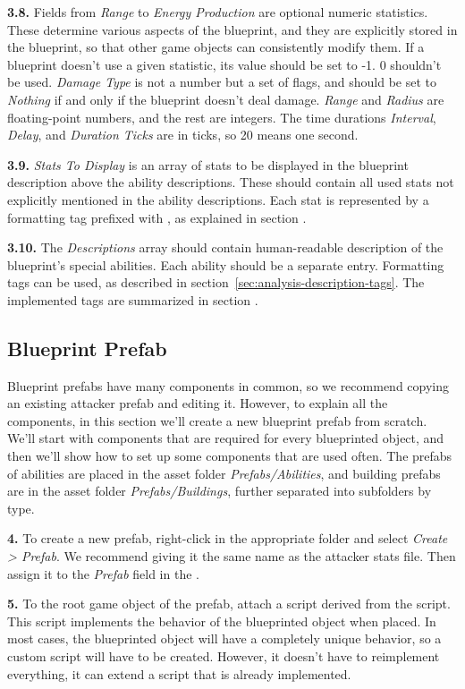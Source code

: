 \textbf{3.8.}
Fields from \emph{Range} to \emph{Energy Production} are optional numeric statistics.
These determine various aspects of the blueprint, and they are explicitly stored in the blueprint, so that other game objects can consistently modify them.
If a blueprint doesn't use a given statistic, its value should be set to -1.
0 shouldn't be used.
\emph{Damage Type} is not a number but a set of flags, and should be set to \emph{Nothing} if and only if the blueprint doesn't deal damage.
\emph{Range} and \emph{Radius} are floating-point numbers, and the rest are integers.
The time durations \emph{Interval}, \emph{Delay}, and \emph{Duration Ticks} are in ticks, so 20 means one second.

\textbf{3.9.}
\emph{Stats To Display} is an array of stats to be displayed in the blueprint description above the ability descriptions.
These should contain all used stats not explicitly mentioned in the ability descriptions.
Each stat is represented by a formatting tag prefixed with \mono{\$}, as explained in section .

\textbf{3.10.}
The \emph{Descriptions} array should contain human-readable description of the blueprint's special abilities.
Each ability should be a separate entry.
Formatting tags can be used, as described in section~\ref{sec:analysis-description-tags}.
The implemented tags are summarized in section .

\subsection{Blueprint Prefab}

Blueprint prefabs have many components in common, so we recommend copying an existing attacker prefab and editing it.
However, to explain all the components, in this section we'll create a new blueprint prefab from scratch.
We'll start with components that are required for every blueprinted object, and then we'll show how to set up some components that are used often.
The prefabs of abilities are placed in the asset folder \emph{Prefabs/Abilities}, and building prefabs are in the asset folder \emph{Prefabs/Buildings}, further separated into subfolders by type.

\textbf{4.}
To create a new prefab, right-click in the appropriate folder and select \emph{Create > Prefab}.
We recommend giving it the same name as the attacker stats file.
Then assign it to the \emph{Prefab} field in the .

\textbf{5.}
To the root game object of the prefab, attach a script derived from the  script.
This script implements the behavior of the blueprinted object when placed.
In most cases, the blueprinted object will have a completely unique behavior, so a custom script will have to be created.
However, it doesn't have to reimplement everything, it can extend a script that is already implemented.

